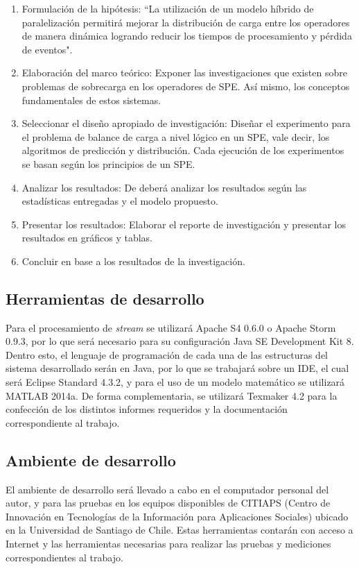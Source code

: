\documentclass[12pt,letterpaper]{article}
\begin{document}
\begin{enumerate}
\item Formulación de la hipótesis: ``La utilización de un modelo híbrido de paralelización permitirá mejorar la distribución de carga entre los operadores de manera dinámica logrando reducir los tiempos de procesamiento y pérdida de eventos".
\item Elaboración del marco teórico: Exponer las investigaciones que existen sobre problemas de sobrecarga en los operadores de SPE. Así mismo, los conceptos fundamentales de estos sistemas.
\item Seleccionar el diseño apropiado de investigación: Diseñar el experimento para el problema de balance de carga a nivel lógico en un SPE, vale decir, los algoritmos de predicción y distribución. Cada ejecución de los experimentos se basan según los principios de un SPE.
\item Analizar los resultados: De deberá analizar los resultados según las estadísticas entregadas y el modelo propuesto.
\item Presentar los resultados: Elaborar el reporte de investigación y presentar los resultados en gráficos y tablas.
\item Concluir en base a los resultados de la investigación.
\end{enumerate}

\subsection{Herramientas de desarrollo}
Para el procesamiento de \textsl{stream} se utilizará Apache S4 0.6.0 o Apache Storm 0.9.3, por lo que será necesario para su configuración Java SE Development Kit 8. Dentro esto, el lenguaje de programación de cada una de las estructuras del sistema desarrollado serán en Java, por lo que se trabajará sobre un IDE, el cual será Eclipse Standard 4.3.2, y para el uso de un modelo matemático se utilizará MATLAB 2014a. De forma complementaria, se utilizará Texmaker 4.2 para la confección de los distintos informes requeridos y la documentación correspondiente al trabajo.

\subsection{Ambiente de desarrollo}
El ambiente de desarrollo será llevado a cabo en el computador personal del autor, y para las pruebas en los equipos disponibles de CITIAPS (Centro de Innovación en Tecnologías de la Información para Aplicaciones Sociales) ubicado en la Universidad de Santiago de Chile. Estas herramientas contarán con acceso a Internet y las herramientas necesarias para realizar las pruebas y mediciones correspondientes al trabajo.
\end{document}
